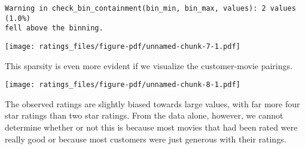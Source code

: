\documentclass[
  letterpaper,
  DIV=11,
  numbers=noendperiod]{scrartcl}
\newenvironment{Shaded}{\begin{snugshade}}{\end{snugshade}}
\newcommand{\AttributeTok}[1]{\textcolor[rgb]{0.40,0.45,0.13}{#1}}
\newcommand{\ControlFlowTok}[1]{\textcolor[rgb]{0.00,0.23,0.31}{#1}}
\newcommand{\DecValTok}[1]{\textcolor[rgb]{0.68,0.00,0.00}{#1}}
\newcommand{\FunctionTok}[1]{\textcolor[rgb]{0.28,0.35,0.67}{#1}}
\newcommand{\NormalTok}[1]{\textcolor[rgb]{0.00,0.23,0.31}{#1}}
\newcommand{\OtherTok}[1]{\textcolor[rgb]{0.00,0.23,0.31}{#1}}
\newcommand{\SpecialCharTok}[1]{\textcolor[rgb]{0.37,0.37,0.37}{#1}}
\newcommand{\StringTok}[1]{\textcolor[rgb]{0.13,0.47,0.30}{#1}}
\begin{document}
\begin{verbatim}
Warning in check_bin_containment(bin_min, bin_max, values): 2 values (1.0%)
fell above the binning.
\end{verbatim}

\texttt{[image: ratings\_files/figure-pdf/unnamed-chunk-7-1.pdf]}

This sparsity is even more evident if we visualize the customer-movie
pairings.

\begin{Shaded}
\end{Shaded}

\texttt{[image: ratings\_files/figure-pdf/unnamed-chunk-8-1.pdf]}

The observed ratings are slightly biased towards large values, with far
more four star ratings than two star ratings. From the data alone,
however, we cannot determine whether or not this is because most movies
that had been rated were really good or because most customers were just
generous with their ratings.
\end{document}
